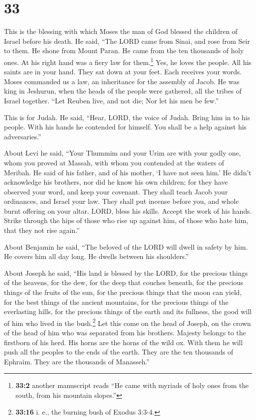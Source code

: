 \hypertarget{section-32}{%
\section{33}\label{section-32}}

 This is the blessing with which Moses the man of God
blessed the children of Israel before his death.  He said,
``The LORD came from Sinai, and rose from Seir to them. He shone from
Mount Paran. He came from the ten thousands of holy ones. At his right
hand was a fiery law for them.\footnote{\textbf{33:2} another manuscript
  reads ``He came with myriads of holy ones from the south, from his
  mountain slopes.''}  Yes, he loves the people. All his
saints are in your hand. They sat down at your feet. Each receives your
words.  Moses commanded us a law, an inheritance for the
assembly of Jacob.  He was king in Jeshurun, when the
heads of the people were gathered, all the tribes of Israel together.
 ``Let Reuben live, and not die; Nor let his men be few.''

 This is for Judah. He said, ``Hear, LORD, the voice of
Judah. Bring him in to his people. With his hands he contended for
himself. You shall be a help against his adversaries.''

 About Levi he said, ``Your Thummim and your Urim are with
your godly one, whom you proved at Massah, with whom you contended at
the waters of Meribah.  He said of his father, and of his
mother, `I have not seen him.' He didn't acknowledge his brothers, nor
did he know his own children; for they have observed your word, and keep
your covenant.  They shall teach Jacob your ordinances,
and Israel your law. They shall put incense before you, and whole burnt
offering on your altar.  LORD, bless his skills. Accept
the work of his hands. Strike through the hips of those who rise up
against him, of those who hate him, that they not rise again.''

 About Benjamin he said, ``The beloved of the LORD will
dwell in safety by him. He covers him all day long. He dwells between
his shoulders.''

 About Joseph he said, ``His land is blessed by the LORD,
for the precious things of the heavens, for the dew, for the deep that
couches beneath,  for the precious things of the fruits
of the sun, for the precious things that the moon can yield,
 for the best things of the ancient mountains, for the
precious things of the everlasting hills,  for the
precious things of the earth and its fullness, the good will of him who
lived in the bush.\footnote{\textbf{33:16} i. e., the burning bush of
  Exodus 3:3-4.} Let this come on the head of Joseph, on the crown of
the head of him who was separated from his brothers. 
Majesty belongs to the firstborn of his herd. His horns are the horns of
the wild ox. With them he will push all the peoples to the ends of the
earth. They are the ten thousands of Ephraim. They are the thousands of
Manasseh.''

